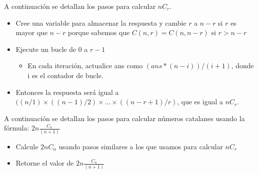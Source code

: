 A continuación se detallan los pasos para calcular $nC_r$.

\begin{itemize}
	\item Cree una variable para almacenar la respuesta y cambie $r$ a $n-r$ si $r$ es mayor que $n-r$ porque sabemos que $C(n, r) = C(n, n-r)$ si $r > n-r$
	\item Ejecute un bucle de $0$ a $r-1$
	\begin{itemize}
		\item En cada iteración, actualice ans como $(ans*(n-i))/(i+1)$, donde i es el contador de bucle.
	\end{itemize}
	\item Entonces la respuesta será igual a $((n/1)\times((n-1)/2) \times \dots \times ((n-r+1)/r)$, que es igual a $nC_r$.
\end{itemize}

A continuación se detallan los pasos para calcular números catalanes usando la fórmula: $2n\frac{C_n}{(n+1)}$

\begin{itemize}
	\item Calcule $2nC_n$ usando pasos similares a los que usamos para calcular $nC_r$
	\item Retorne el valor de $2n\frac{C_n}{(n+1)}$
\end{itemize}

